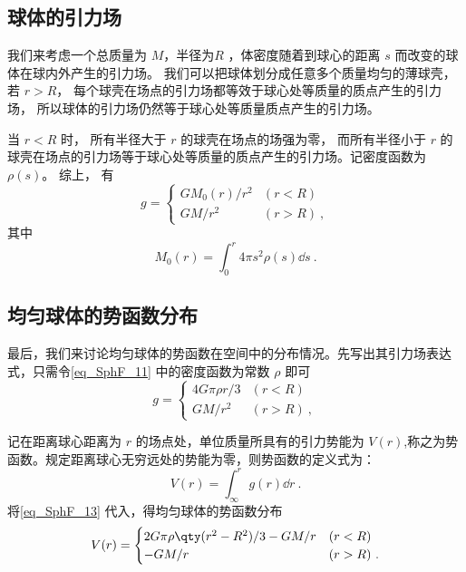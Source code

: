 \subsection{球体的引力场}
我们来考虑一个总质量为 $M$，半径为$R$ ，体密度随着到球心的距离 $s$ 而改变的球体在球内外产生的引力场。 我们可以把球体划分成任意多个质量均匀的薄球壳， 若 $r > R$， 每个球壳在场点的引力场都等效于球心处等质量的质点产生的引力场， 所以球体的引力场仍然等于球心处等质量质点产生的引力场。

当 $r < R$ 时， 所有半径大于 $r$ 的球壳在场点的场强为零， 而所有半径小于 $r$ 的球壳在场点的引力场等于球心处等质量的质点产生的引力场。记密度函数为 $\rho(s)$。 综上， 有
\begin{equation}\label{eq_SphF_11}
g =
\begin{cases}
GM_0(r)/r^2 &(r < R)\\
GM/r^2 & (r > R)~,
\end{cases}
\end{equation}
其中
\begin{equation}
M_0(r) = \int_0^r 4\pi s^2 \rho(s) \dd{s}~.
\end{equation}

\subsection{均匀球体的势函数分布}
最后，我们来讨论均匀球体的势函数在空间中的分布情况。先写出其引力场表达式，只需令\autoref{eq_SphF_11}  中的密度函数为常数 $\rho$ 即可
\begin{equation}\label{eq_SphF_13}
g =
\begin{cases}
4G\pi \rho r/3  &(r < R)\\
GM/r^2 & (r > R)~,
\end{cases}
\end{equation}

记在距离球心距离为 $r$ 的场点处，单位质量所具有的引力势能为 $V(r)$,称之为势函数。规定距离球心无穷远处的势能为零，则势函数的定义式为：
\begin{equation}
V(r) = \int_\infty^r g(r) \dd{r}~.
\end{equation}
将\autoref{eq_SphF_13} 代入，得均匀球体的势函数分布
\begin{equation}
V(r) =
\begin{cases}
2G\pi \rho \qty(r^2-R^2)/3 - GM/r  &(r < R)\\
-GM/r & (r > R)~.
\end{cases}
\end{equation}
